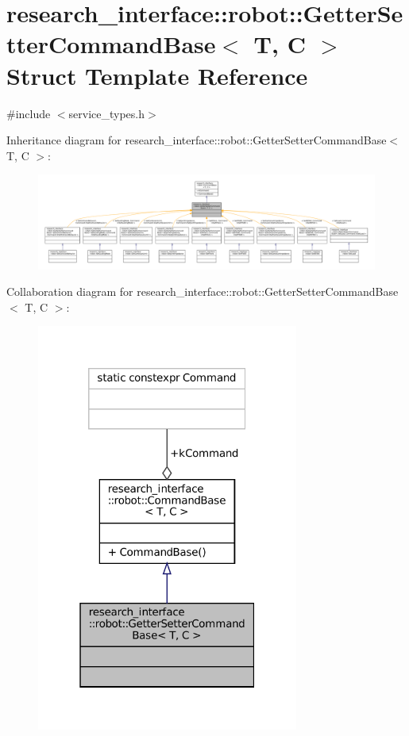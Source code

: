 \hypertarget{structresearch__interface_1_1robot_1_1GetterSetterCommandBase}{}\section{research\+\_\+interface\+:\+:robot\+:\+:Getter\+Setter\+Command\+Base$<$ T, C $>$ Struct Template Reference}
\label{structresearch__interface_1_1robot_1_1GetterSetterCommandBase}


{\ttfamily \#include $<$service\+\_\+types.\+h$>$}



Inheritance diagram for research\+\_\+interface\+:\+:robot\+:\+:Getter\+Setter\+Command\+Base$<$ T, C $>$\+:
\nopagebreak
\begin{figure}[H]
\begin{center}
\leavevmode
\includegraphics[width=350pt]{structresearch__interface_1_1robot_1_1GetterSetterCommandBase__inherit__graph}
\end{center}
\end{figure}


Collaboration diagram for research\+\_\+interface\+:\+:robot\+:\+:Getter\+Setter\+Command\+Base$<$ T, C $>$\+:
\nopagebreak
\begin{figure}[H]
\begin{center}
\leavevmode
\includegraphics[width=244pt]{structresearch__interface_1_1robot_1_1GetterSetterCommandBase__coll__graph}
\end{center}
\end{figure}
